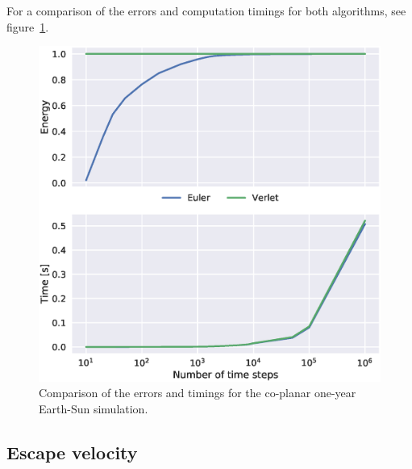 \documentclass[aps,reprint]{revtex4-1}
\begin{document}
For a comparison of the errors and computation timings for both algorithms, see
figure~\ref{fig:timing}.

\begin{figure}[H]
  \includegraphics[width=\columnwidth]{figures/timing.eps}
  \caption{Comparison of the errors and timings for the co-planar one-year Earth-Sun
  simulation.}
  \label{fig:timing}
\end{figure}

\subsection{Escape velocity}
\end{document}

